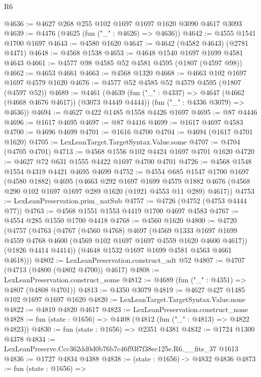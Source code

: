 \begin{lexlean}{R6}
\begin{coremodule}
@4636 := @4627 @268 @255 @102 @1697 @1697 @1620 @3090 @4617 @3093
@4639 := @4476 (@4625 (fun ("_" : @4626) => @4636))
@4642 := @4555 @1541 @1700 @1697
@4643 := @4580 @1620
@4647 := @4642 (@4582 @4643) (@2781 @4471)
@4648 := @4568 @1538
@4653 := @4648 @1540 @1697 @1699 @4581 @4643
@4661 := @4577 @98 @4585 @52 @4581 @4595 (@1807 (@4597 @98))
@4662 := @4653 @4661
@4663 := @4568 @1320
@4668 := @4663 @102 @1697 @1697 @4579 @1620
@4676 := @4577 @52 @4585 @52 @4579 @4595 (@1807 (@4597 @52))
@4689 := @4461
    (@4639
      (fun ("_" : @4337) => @4647 (@4662 (@4668 @4676 @4617)) (@3073 @4449 @4444))
      (fun ("_" : @4336 @3079) => @4636))
@4694 := @4627 @422 @1485 @1558 @4426 @1697
@4695 := @87 @4446
@4696 := @1617 @4695
@4697 := @87 @4416
@4699 := @1617 @4697 @4583
@4700 := @4696 @4699
@4701 := @1616 @4700
@4704 := @4694 (@1617 @4701 @1620)
@4705 := LexLeanTarget.TargetSyntax.Value.some
@4707 := @4704 (@4705 @4701)
@4713 := @4568 @1556 @102 @4424 @1697 @4701 @1620
@4720 := @4627 @72 @631 @1555 @4422 @1697 @4700 @4701
@4726 := @4568 @1548 @1554 @4319 @4421 @4695 @4699
@4752 := @4554
    @685
    @1547
    @1700
    @1697
    (@4580 @1882)
    @4695
    (@4663
      @292
      @1697
      @1699
      @4579
      @1882
      @4676
      (@4568 @290 @102 @1697 @1697 @289 @1620 (@1921 @4553 @11 @289) @4617))
@4753 := LexLeanPreservation.prim_natSub
@4757 := @4726 (@4752 (@4753 @4444 @77))
@4763 := @4568 @1551 @1553 @4419 @1700 @4697 @4583
@4767 := @4554 @285 @1550 @1700 @4418
@4768 := @4560 @1620
@4800 := @4720
    (@4757
      (@4763
        (@4767
          (@4560 @4768)
          @4697
          (@4569
            @1333
            @1697
            @1699
            @4559
            @4768
            @4600
            (@4569 @102 @1697 @1697 @4559 @1620 @4600 @4617))
          (@1826 @4414 @4414))
        (@4648 @1532 @1697 @1699 @4581 @4563 @4661 @4618)))
@4802 := LexLeanPreservation.construct_adt @52
@4807 := @4707 (@4713 (@4800 (@4802 @4700)) @4617)
@4808 := LexLeanPreservation.construct_some
@4812 := @4689 (fun ("_" : @4351) => @4807 (@4808 @4701))
@4813 := @4350 @3079
@4819 := @4627 @427 @1485 @102 @1697 @1697 @1620
@4820 := LexLeanTarget.TargetSyntax.Value.none
@4822 := @4819 @4820 @4617
@4823 := LexLeanPreservation.construct_none
@4828 := fun (state : @1656) => @4408 (@4812 (fun ("_" : @4813) => @4822 @4823))
@4830 := fun (state : @1656) => @2351 @4381
@4832 := @1724 @1300 @4378
@4834 := LexLeanPreserve.Ccc362dd0d0b76b7c46f93f7f38ec125e.R6.__fits_37 @1613
@4836 := @1727 @4834 @4388
@4838 := (state : @1656) -> @4832 @4836
@4873 := fun (state : @1656) =>

\end{coremodule}
\end{lexlean}
